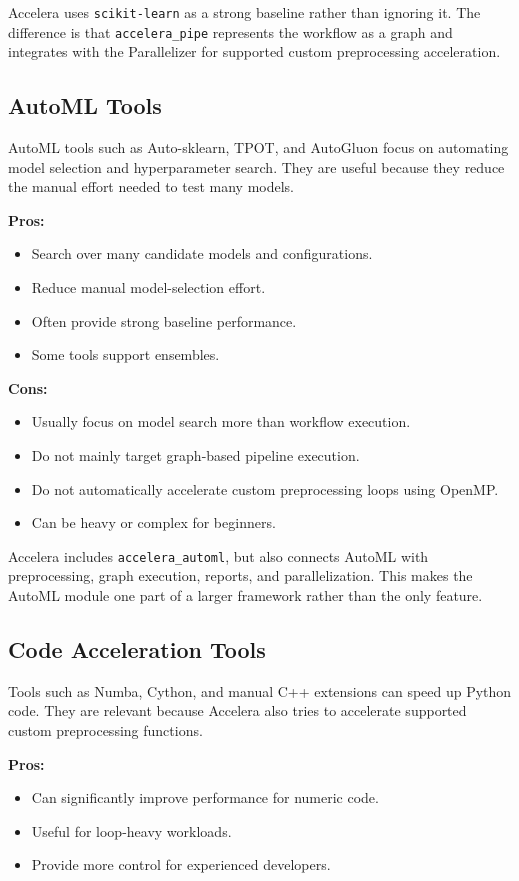 \documentclass[12pt,a4paper]{report}
\begin{document}
Accelera uses \texttt{scikit-learn} as a strong baseline rather than ignoring
it. The difference is that \texttt{accelera\_pipe} represents the workflow as a
graph and integrates with the Parallelizer for supported custom preprocessing
acceleration.

\subsection{AutoML Tools}

AutoML tools such as Auto-sklearn, TPOT, and AutoGluon focus on automating model
selection and hyperparameter search. They are useful because they reduce the
manual effort needed to test many models.

\textbf{Pros:}
\begin{itemize}
  \item Search over many candidate models and configurations.
  \item Reduce manual model-selection effort.
  \item Often provide strong baseline performance.
  \item Some tools support ensembles.
\end{itemize}

\textbf{Cons:}
\begin{itemize}
  \item Usually focus on model search more than workflow execution.
  \item Do not mainly target graph-based pipeline execution.
  \item Do not automatically accelerate custom preprocessing loops using OpenMP.
  \item Can be heavy or complex for beginners.
\end{itemize}

Accelera includes \texttt{accelera\_automl}, but also connects AutoML with
preprocessing, graph execution, reports, and parallelization. This makes the
AutoML module one part of a larger framework rather than the only feature.

\subsection{Code Acceleration Tools}

Tools such as Numba, Cython, and manual C++ extensions can speed up Python code.
They are relevant because Accelera also tries to accelerate supported custom
preprocessing functions.

\textbf{Pros:}
\begin{itemize}
  \item Can significantly improve performance for numeric code.
  \item Useful for loop-heavy workloads.
  \item Provide more control for experienced developers.
\end{itemize}
\end{document}
